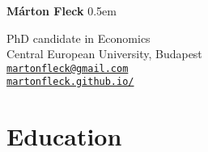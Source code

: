 \documentclass[a4paper,11pt]{article}
\begin{document}
{\huge\bf Márton Fleck}
\parskip 0.5em

PhD candidate in Economics \\
Central European University, Budapest \\
\href{mailto:martonfleck@gmail.com}{\tt martonfleck@gmail.com} \\
\href{https://martonfleck.github.io}{\tt martonfleck.github.io/}
\section*{Education}
\end{document}

